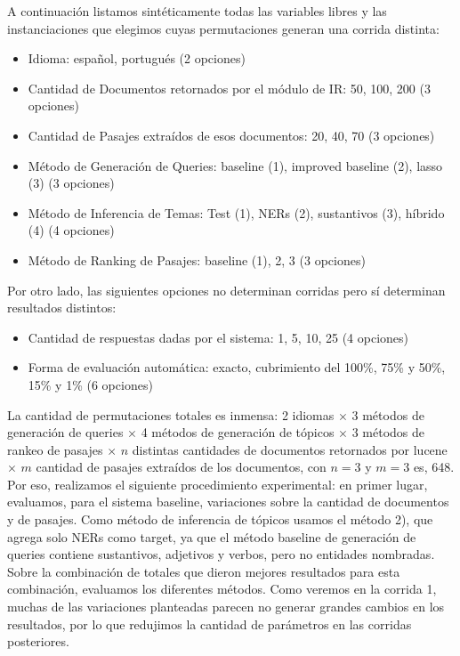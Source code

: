 A continuación listamos sintéticamente todas las variables libres y las instanciaciones que elegimos cuyas permutaciones generan una corrida distinta:

\begin{itemize}
  \item Idioma: español, portugués (2 opciones)
  \item Cantidad de Documentos retornados por el módulo de IR: 50, 100, 200 (3 opciones)
  \item Cantidad de Pasajes extraídos de esos documentos: 20, 40, 70 (3 opciones)
  \item Método de Generación de Queries: baseline (1), improved baseline (2), lasso (3) (3 opciones)
  \item Método de Inferencia de Temas: Test (1), NERs (2), sustantivos (3), híbrido (4) (4 opciones)
  \item Método de Ranking de Pasajes: baseline (1), 2, 3 (3 opciones)
\end{itemize}

Por otro lado, las siguientes opciones no determinan corridas pero sí determinan resultados distintos:

\begin{itemize}
  \item Cantidad de respuestas dadas por el sistema: 1, 5, 10, 25 (4 opciones)
  \item Forma de evaluación automática: exacto, cubrimiento del 100\%, 75\% y 50\%, 15\%  y 1\% (6 opciones)
\end{itemize}

La cantidad de permutaciones totales es inmensa: 2 idiomas $\times$ 3 métodos de generación de queries $\times$ 4 métodos de generación de tópicos $\times$ 3 métodos de rankeo de pasajes $\times$ $n$ distintas cantidades de documentos retornados por lucene $\times$ $m$ cantidad de pasajes extraídos de los documentos, con $n=3$ y $m=3$ es, 648. Por eso, realizamos el siguiente procedimiento experimental: en primer lugar, evaluamos, para el sistema baseline, variaciones sobre la cantidad de documentos y de pasajes. Como método  de inferencia de tópicos usamos el método 2), que agrega solo NERs como target, ya que el método baseline de generación de queries contiene sustantivos, adjetivos y verbos, pero no entidades nombradas. Sobre la combinación de totales que dieron mejores resultados para esta combinación, evaluamos los diferentes métodos. Como veremos en la corrida 1, muchas de las variaciones planteadas parecen no generar grandes cambios en los resultados, por lo que redujimos la cantidad de parámetros en las corridas posteriores. \newline

